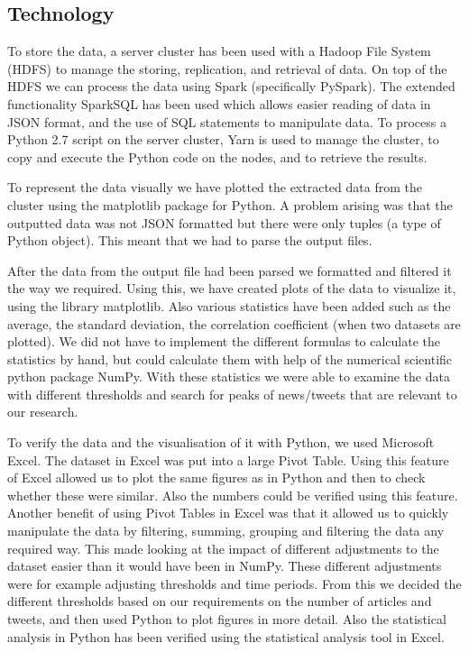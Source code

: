 \documentclass[paper=a4, fontsize=9px]{scrartcl} %
\numberwithin{equation}{section} %
\numberwithin{figure}{section} %
\numberwithin{table}{section} %
\begin{document}
\begin{multicols}{2}
\subsection{Technology}\label{sec:technology}

To store the data, a server cluster has been used with a Hadoop File System (HDFS) to manage the storing, replication, and retrieval of data. On top of the HDFS we can process the data using Spark (specifically PySpark). The extended functionality SparkSQL has been used which allows easier reading of data in JSON format, and the use of SQL statements to manipulate data. 
To process a Python 2.7 script on the server cluster, Yarn is used to manage the cluster, to copy and execute the Python code on the nodes, and to retrieve the results. 

To represent the data visually we have plotted the extracted data from the cluster using the matplotlib package for Python. A problem arising was that the outputted data was not JSON formatted but there were only tuples (a type of Python object).  This meant that we had to parse the output files.

After the data from the output file had been parsed we formatted and filtered it the way we required. Using this, we have created plots of the data to visualize it, using the library matplotlib. Also various statistics have been added such as the average, the standard deviation, the correlation coefficient (when two datasets are plotted). We did not have to implement the different formulas to calculate the statistics by hand, but could calculate them with help of the numerical scientific python package NumPy. With these statistics we were able to examine the data with different thresholds and search for peaks of news/tweets that are relevant to our research.

To verify the data and the visualisation of it with Python, we used Microsoft Excel. The dataset in Excel was put into a large Pivot Table. Using this feature of Excel allowed us to plot the same figures as in Python and then to check whether these were similar. Also the numbers could be verified using this feature. 
Another benefit of using Pivot Tables in Excel was that it allowed us to quickly manipulate the data by filtering, summing, grouping and filtering the data any required way. This made looking at the impact of different adjustments to the dataset easier than it would have been in NumPy. These different adjustments were for example adjusting thresholds and time periods. From this we decided the different thresholds based on our requirements on the number of articles and tweets, and then used Python to plot figures in more detail. Also the statistical analysis in Python has been verified using the statistical analysis tool in Excel.




\end{multicols}
\end{document}
